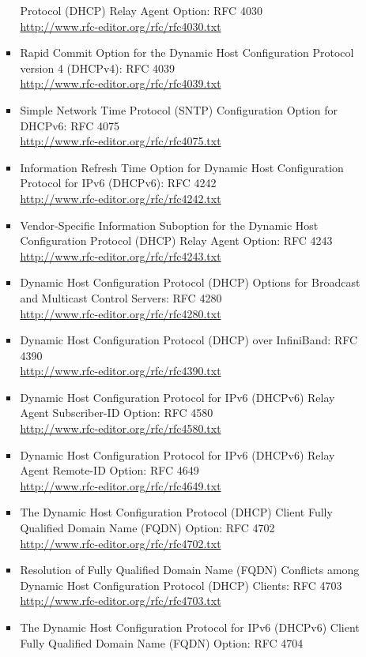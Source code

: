 \begin{itemize}
\begin{itemize}
\begin{itemize}
Protocol (DHCP) Relay Agent Option: RFC 4030\\
\url{http://www.rfc-editor.org/rfc/rfc4030.txt}
\item Rapid Commit Option for the Dynamic Host Configuration Protocol 
version 4 (DHCPv4): RFC 4039\\
\url{http://www.rfc-editor.org/rfc/rfc4039.txt}
\item Simple Network Time Protocol (SNTP) Configuration Option for 
DHCPv6: RFC 4075\\
\url{http://www.rfc-editor.org/rfc/rfc4075.txt}
\item Information Refresh Time Option for Dynamic Host Configuration 
Protocol for IPv6 (DHCPv6): RFC 4242\\
\url{http://www.rfc-editor.org/rfc/rfc4242.txt}
\item Vendor-Specific Information Suboption for the Dynamic Host 
Configuration Protocol (DHCP) Relay Agent Option: RFC 4243\\
\url{http://www.rfc-editor.org/rfc/rfc4243.txt}
\item Dynamic Host Configuration Protocol (DHCP) Options for Broadcast 
and Multicast Control Servers: RFC 4280\\
\url{http://www.rfc-editor.org/rfc/rfc4280.txt}
\item Dynamic Host Configuration Protocol (DHCP) over InfiniBand: 
RFC 4390\\
\url{http://www.rfc-editor.org/rfc/rfc4390.txt}
\item Dynamic Host Configuration Protocol for IPv6 (DHCPv6) Relay 
Agent Subscriber-ID Option: RFC 4580\\
\url{http://www.rfc-editor.org/rfc/rfc4580.txt}
\item Dynamic Host Configuration Protocol for IPv6 (DHCPv6) Relay 
Agent Remote-ID Option: RFC 4649\\
\url{http://www.rfc-editor.org/rfc/rfc4649.txt}
\item The Dynamic Host Configuration Protocol (DHCP) Client Fully 
Qualified Domain Name (FQDN) Option: RFC 4702\\
\url{http://www.rfc-editor.org/rfc/rfc4702.txt}
\item Resolution of Fully Qualified Domain Name (FQDN) Conflicts 
among Dynamic Host Configuration Protocol (DHCP) Clients: RFC 4703\\
\url{http://www.rfc-editor.org/rfc/rfc4703.txt}
\item The Dynamic Host Configuration Protocol for IPv6 (DHCPv6) 
Client Fully Qualified Domain Name (FQDN) Option: RFC 4704\\

\end{itemize}
\end{itemize}
\end{itemize}
